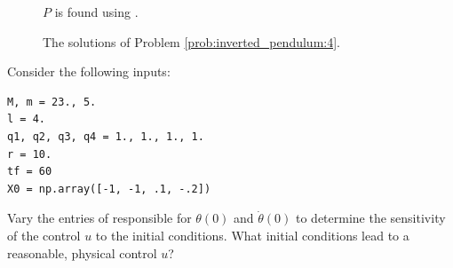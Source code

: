 \begin{figure}
\begin{minipage}[b]{0.47\linewidth}
\caption*{$P$ is found using .}
\end{minipage}
\caption{The solutions of Problem \ref{prob:inverted_pendulum:4}.}
\label{fig:inverted_pendulum:4}
\end{figure}



\begin{problem}
Consider the following inputs: 
\begin{lstlisting}
M, m = 23., 5.
l = 4.
q1, q2, q3, q4 = 1., 1., 1., 1.
r = 10.
tf = 60
X0 = np.array([-1, -1, .1, -.2])
\end{lstlisting}
Vary the entries of  responsible for $\theta(0)$ and $\dot{\theta}(0)$ to determine the sensitivity of the control $u$ to the initial conditions.  What initial conditions lead to a reasonable, physical control $u$?
\end{problem}

%
%
%
%
%
%



